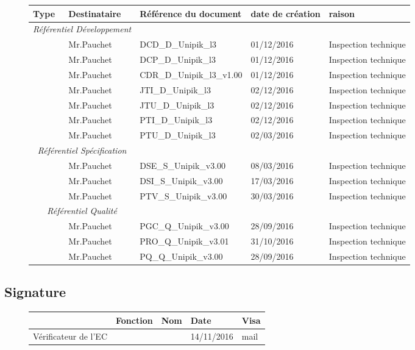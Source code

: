 \documentclass[asi, sansVersion]{picInsa}
\begin{document}
\begin{figure}[H]
		\centering
		\begin{tabularx}{17cm}{|X|X|p{5cm}|p{2cm}|X|}
		\hline
		\rowcolor[gray]{0.85}Type & Destinataire & Référence du document & date de création & raison\\
		\hline
		\multicolumn{2}{|c|}{\textit{Référentiel Développement}}\\
		\hline 
		\DCD & Mr.Pauchet & DCD\_D\_Unipik\_l3 & 01/12/2016 & Inspection technique \\
		\DCP & Mr.Pauchet & DCP\_D\_Unipik\_l3 & 01/12/2016 & Inspection technique \\	
		\CDR & Mr.Pauchet & CDR\_D\_Unipik\_l3\_v1.00 & 01/12/2016 & Inspection technique \\
		\JTI & Mr.Pauchet & JTI\_D\_Unipik\_l3 & 02/12/2016 & Inspection technique \\
		\JTU & Mr.Pauchet & JTU\_D\_Unipik\_l3 & 02/12/2016 & Inspection technique \\
		\PTI & Mr.Pauchet & PTI\_D\_Unipik\_l3 & 02/12/2016 & Inspection technique \\
		\PTU & Mr.Pauchet & PTU\_D\_Unipik\_l3 & 02/03/2016 & Inspection technique \\
		\hline 
		\multicolumn{2}{|c|}{\textit{Référentiel Spécification}}\\
		\hline
		\DSE & Mr.Pauchet & DSE\_S\_Unipik\_v3.00 & 08/03/2016 & Inspection technique \\
		\DSI & Mr.Pauchet & DSI\_S\_Unipik\_v3.00 & 17/03/2016 & Inspection technique \\
		\PTV & Mr.Pauchet & PTV\_S\_Unipik\_v3.00 & 30/03/2016 & Inspection technique \\	
		\hline 
		\multicolumn{2}{|c|}{\textit{Référentiel Qualité}}\\
		\hline
		\PGC & Mr.Pauchet & PGC\_Q\_Unipik\_v3.00 & 28/09/2016 & Inspection technique \\ 
		\PRO & Mr.Pauchet & PRO\_Q\_Unipik\_v3.01 & 31/10/2016 & Inspection technique \\
		\PQ & Mr.Pauchet & PQ\_Q\_Unipik\_v3.00 & 28/09/2016 & Inspection technique \\
		\hline 
		\end{tabularx}
\end{figure}

\subsection*{Signature}

\begin{figure}[H]
		\centering
		\begin{tabularx}{17cm}{|p{4cm}|X|X|X|X|}
		\hline
		\rowcolor[gray]{0.85}& Fonction & Nom & Date & Visa \\
		\hline
		 Vérificateur de l'EC & \CP & \Pierre & 14/11/2016 & mail \\
		\hline
		\end{tabularx}
\end{figure}
\end{document}
